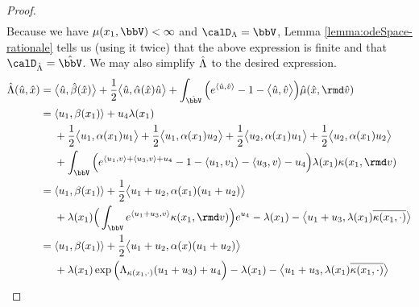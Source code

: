 \begin{proof}
\begin{align*}
  \end{align*}
  Because we have $\affJump(\stateVar_1, \vecSpace) < \infty$ and $\odeSpace = \vecSpace$, Lemma \ref{lemma:odeSpace-rationale} tells us (using it twice) that the above expression is finite and that $\odeSpaceJoint = \hat\vecSpace$.
  We may also simplify $\hat{\Lambda}$ to the desired expression.
  \begin{align*}
    \hat\ode(\hat\momentVar, \hat\stateVar) 
    &= \bprj{\hat\momentVar}{\hat\affDrift(\hat\stateVar)} + \frac12\bprj{\hat\momentVar}{\hat\affDiff(\hat\stateVar)\hat\momentVar} + \int_{\hat\vecSpace} \Big( e^\prj{\hat\momentVar}{\hat\markVar} - 1 - \bprj{\hat\momentVar}{\hat\markVar} \Big) \hat\affJump(\hat\stateVar, \rmd\hat\markVar) \\
    &= \begin{aligned}[t]
      &\prj{\momentVar_1}{\affDrift(\stateVar_1)} + \momentVar_4\affInt(\stateVar_1) \\
      &+ \frac12\bprj{\momentVar_1}{\affDiff(\stateVar_1)\momentVar_1}  + \frac12\bprj{\momentVar_1}{\affDiff(\stateVar_1)\momentVar_2}  + \frac12\bprj{\momentVar_2}{\affDiff(\stateVar_1)\momentVar_1}+ \frac12\bprj{\momentVar_2}{\affDiff(\stateVar_1)\momentVar_2}\\
      &+ \int_\vecSpace \Big( e^{\prj{\momentVar_1}{\markVar} + \prj{\momentVar_3}{\markVar} + \momentVar_4} - 1 - \prj{\momentVar_1}{\markVar_1} - \prj{\momentVar_3}{\markVar} - \momentVar_4  \Big) \affInt(\stateVar_1) \affDist(\stateVar_1, \rmd\markVar)
    \end{aligned} \\
    &= \begin{aligned}[t]
      &\prj{\momentVar_1}{\affDrift(\stateVar_1)} + \frac12\bprj{\momentVar_1+\momentVar_2}{\affDiff(\stateVar_1)(\momentVar_1+\momentVar_2)}  \\
      &+ \affInt(\stateVar_1)\Big(\int_\vecSpace e^\prj{\momentVar_1+\momentVar_3}{\markVar} \affDist(\stateVar_1, \rmd\markVar) \Big) e^{\momentVar_4} - \affInt(\stateVar_1) - \bprj{\momentVar_1 + \momentVar_3}{\affInt(\stateVar_1)\overline{\affDist(\stateVar_1,\cdot)}}
    \end{aligned} \\
    &= \begin{aligned}[t]
      &\prj{\momentVar_1}{\affDrift(\stateVar_1)} + \frac12\bprj{\momentVar_1+\momentVar_2}{\affDiff(\stateVar)(\momentVar_1+\momentVar_2)} \\
      &+ \affInt(\stateVar_1)\exp\Big(\ode_{\affDist(\stateVar_1,\cdot)}(\momentVar_1+\momentVar_3) + \momentVar_4\Big) - \affInt(\stateVar_1) -  \bprj{\momentVar_1+\momentVar_3}{\affInt(\stateVar_1)\overline{\affDist(\stateVar_1,\cdot)}} 
    \end{aligned}
  \end{align*}
\end{proof}
